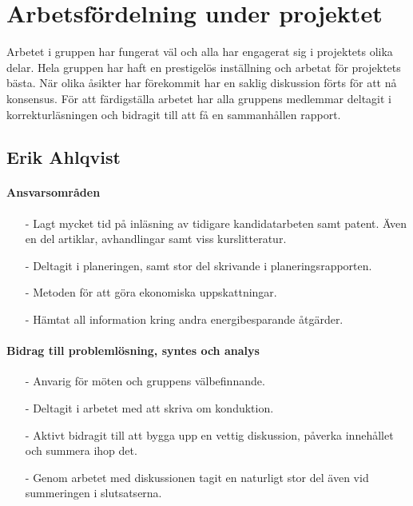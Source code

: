 \documentclass[12pt,a4paper]{article}
\begin{document}

\section*{Arbetsfördelning under projektet}

Arbetet i gruppen har fungerat väl och alla har engagerat sig i projektets olika delar. Hela gruppen har haft en prestigelös inställning och arbetat för projektets bästa. När olika åsikter har förekommit har en saklig diskussion förts för att nå konsensus. För att färdigställa arbetet har alla gruppens medlemmar deltagit i korrekturläsningen och bidragit till att få en sammanhållen rapport.


\subsection*{Erik Ahlqvist}

\paragraph{Ansvarsområden}

\begin{itemize}
\item[-] Lagt mycket tid på inläsning av tidigare kandidatarbeten samt patent. Även en del artiklar, avhandlingar samt viss kurslitteratur. 
\item[-] Deltagit i planeringen, samt stor del skrivande i planeringsrapporten.
\item[-] Metoden för att göra ekonomiska uppskattningar.
\item[-] Hämtat all information kring andra energibesparande åtgärder. 
\end{itemize}


\paragraph{Bidrag till problemlösning, syntes och analys}

\begin{itemize}
\item[-] Anvarig för möten och gruppens välbefinnande.
\item[-] Deltagit i arbetet med att skriva om konduktion.
\item[-] Aktivt bidragit till att bygga upp en vettig diskussion, påverka innehållet och summera ihop det.
\item[-] Genom arbetet med diskussionen tagit en naturligt stor del även vid summeringen i slutsatserna.
\end{itemize}
\end{document}
